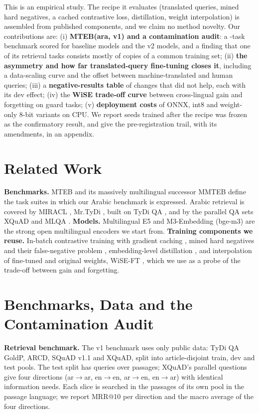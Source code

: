 \documentclass[11pt]{article}
\newcommand{\ardir}{ar$\to$en}
\newcommand{\eadir}{en$\to$ar}
\begin{document}
This is an empirical study.
The recipe it evaluates (translated queries, mined hard negatives, a cached contrastive loss, distillation, weight interpolation) is assembled from published components, and we claim no method novelty.
Our contributions are:
(i) \textbf{MTEB(ara, v1) and a contamination audit}: a \NumMtebTasks-task benchmark scored for \NumMtebModels{} baseline models and the v2 models, and a finding that one of its retrieval tasks consists mostly of copies of a common training set;
(ii) \textbf{the asymmetry and how far translated-query fine-tuning closes it}, including a data-scaling curve and the offset between machine-translated and human queries;
(iii) a \textbf{negative-results table} of changes that did not help, each with its dev effect;
(iv) the \textbf{WiSE trade-off curve} between cross-lingual gain and forgetting on guard tasks;
(v) \textbf{deployment costs} of ONNX, int8 and weight-only 8-bit variants on CPU.
We report seeds trained after the recipe was frozen as the confirmatory result, and give the pre-registration trail, with its amendments, in an appendix.

\section{Related Work}
\textbf{Benchmarks.} MTEB \citep{muennighoff2023mteb} and its massively multilingual successor MMTEB \citep{enevoldsen2025mmteb} define the task suites in which our Arabic benchmark is expressed.
Arabic retrieval is covered by MIRACL \citep{zhang2023miracl}, Mr.TyDi \citep{zhang2021mrtydi}, built on TyDi QA \citep{clark2020tydiqa}, and by the parallel QA sets XQuAD \citep{artetxe2020xquad} and MLQA \citep{lewis2020mlqa}.
\textbf{Models.} Multilingual E5 \citep{wang2024me5,wang2022e5} and M3-Embedding (bge-m3) \citep{chen2024m3} are the strong open multilingual encoders we start from.
\textbf{Training components we reuse.} In-batch contrastive training \citep{henderson2017efficient,reimers2019sbert} with gradient caching \citep{gao2021cachedmnrl}, mined hard negatives and their false-negative problem \citep{xiong2021ance,qu2021rocketqa}, embedding-level distillation \citep{hinton2015distilling,hofstatter2021crossarch}, and interpolation of fine-tuned and original weights, WiSE-FT \citep{wortsman2022wiseft}, which we use as a probe of the trade-off between gain and forgetting.

\section{Benchmarks, Data and the Contamination Audit}\label{sec:data}
\textbf{Retrieval benchmark.} The v1 benchmark uses only public data: TyDi QA GoldP, ARCD, SQuAD v1.1 \citep{rajpurkar2016squad,mozannar2019arcd} and XQuAD, split into article-disjoint train, dev and test pools.
The test split has \NumTestQueries{} queries over \NumTestPassages{} passages; XQuAD's parallel questions give four directions (ar$\to$ar, en$\to$en, \ardir, \eadir) with identical information needs.
Each slice is searched in the passages of its own pool in the passage language; we report MRR@10 per direction and the macro average of the four directions.
\end{document}
